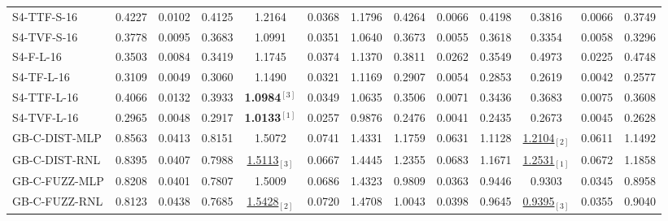 \begin{table*}[ht!]
{\begin{tabular}{l c|cc >{\columncolor{gray!20}}c|cc c|cc >{\columncolor{gray!20}}c|cc}
            S4-TTF-S-16 & 0.4227 & 0.0102 & 0.4125 & 1.2164 & 0.0368 & 1.1796 & 0.4264 & 0.0066 & 0.4198 & 0.3816 & 0.0066 & 0.3749\\
            S4-TVF-S-16 & 0.3778 & 0.0095 & 0.3683 & 1.0991	& 0.0351 & 1.0640 & 0.3673 & 0.0055 & 0.3618 & 0.3354 & 0.0058 & 0.3296\\
            \hline
            S4-F-L-16 & 0.3503 & 0.0084 & 0.3419 & 1.1745 & 0.0374 & 1.1370 & 0.3811 & 0.0262 & 0.3549 & 0.4973 & 0.0225 & 0.4748\\
            S4-TF-L-16 & 0.3109 & 0.0049 & 0.3060 & 1.1490 & 0.0321 & 1.1169 & 0.2907 & 0.0054 & 0.2853 & 0.2619 & 0.0042 & 0.2577\\
            S4-TTF-L-16 & 0.4066 & 0.0132 & 0.3933 & \textbf{1.0984}$^{[3]}$ & 0.0349 & 1.0635 & 0.3506 & 0.0071 & 0.3436 & 0.3683 & 0.0075 & 0.3608\\
            S4-TVF-L-16 & 0.2965 & 0.0048 & 0.2917 & \textbf{1.0133}$^{[1]}$ & 0.0257 & 0.9876 & 0.2476 & 0.0041 & 0.2435 & 0.2673 & 0.0045 & 0.2628\\
            \hline
            \hline
            GB-C-DIST-MLP & 0.8563 & 0.0413 & 0.8151 & 1.5072 & 0.0741 & 1.4331 & 1.1759 & 0.0631 & 1.1128 & \underline{1.2104}$_{[2]}$ & 0.0611 & 1.1492\\
            GB-C-DIST-RNL & 0.8395 & 0.0407 & 0.7988 & \underline{1.5113}$_{[3]}$ & 0.0667 & 1.4445 & 1.2355 & 0.0683 & 1.1671 & \underline{1.2531}$_{[1]}$ & 0.0672 & 1.1858\\
            \hline
            GB-C-FUZZ-MLP & 0.8208 & 0.0401 & 0.7807 & 1.5009 & 0.0686 & 1.4323 & 0.9809 & 0.0363 & 0.9446 & 0.9303 & 0.0345 & 0.8958\\
            GB-C-FUZZ-RNL & 0.8123 & 0.0438 & 0.7685 & \underline{1.5428}$_{[2]}$ & 0.0720 & 1.4708 & 1.0043 & 0.0398 & 0.9645 & \underline{0.9395}$_{[3]}$ & 0.0355 & 0.9040\\
            \hline
            \hline
        \end{tabular}
    }
\end{table*}
